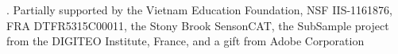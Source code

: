 \documentclass[runningheads]{llncs}
\begin{document}
. Partially supported by the Vietnam Education Foundation, NSF IIS-1161876, FRA DTFR5315C00011,  the Stony Brook SensonCAT, the SubSample project from the DIGITEO Institute, France, and a gift from Adobe Corporation
\FloatBarrier



\vspace{3mm}




\end{document}
